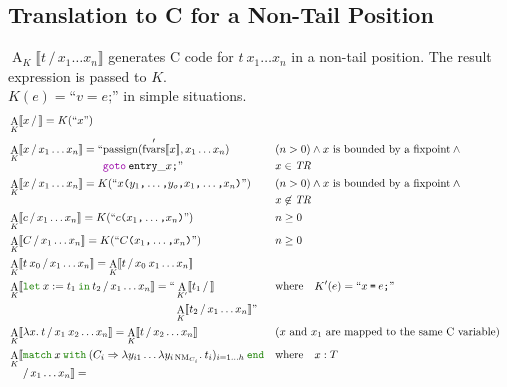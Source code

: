 \documentclass[a4paper,fleqn]{article}
\newcommand{\kwlet}{\mbox{\color{mygreen}\ttfamily let}}
\newcommand{\kwin}{\mbox{\color{mygreen}\ttfamily in}}
\newcommand{\kwmatch}{\mbox{\color{mygreen}\ttfamily match}}
\newcommand{\kwwith}{\mbox{\color{mygreen}\ttfamily with}}
\newcommand{\kwend}{\mbox{\color{mygreen}\ttfamily end}}
\newcommand{\lam}[2]{\lambda #1.\:#2}
\newcommand{\lamB}[1]{\lambda #1.\:}
\newcommand{\letin}[3]{\kwlet\:#1:=#2\:\kwin\:#3}
\newcommand{\match}[4]{\kwmatch\:#1\:\kwwith\:(#2 \Rightarrow #3)_{#4}\:\kwend}
\DeclareMathOperator{\NM}{NM} %
\newcommand{\BRA}[1]{\llbracket #1 \rrbracket}
\newcommand{\tr}{\mathit{TR}}
\newcommand{\ldq}{\text{``}}
\newcommand{\rdq}{\text{''}}
\newcommand{\dq}[1]{\text{``}#1\text{''}}
\newcommand{\ttparen}[1]{\texttt{(}#1\texttt{)}}
\newcommand{\tteq}{\texttt{=}}
\newcommand{\ttsemi}{\texttt{;}}
\newcommand{\ttcomma}{\texttt{,}}
\newcommand{\kwgoto}{\mbox{\color{myviolet}\ttfamily goto}}
\DeclareMathOperator{\passign}{passign}
\DeclareMathOperator{\fvarsop}{fvars}
\newcommand{\fvarsd}[1]{\fvarsop'\BRA{#1}}
\DeclareMathOperator{\Aop}{A}
\newcommand{\A}[3]{\Aop_{#1}\BRA{#2\,/\,#3}}
\newcommand{\AbreakEq}[3]{\Aop_{#1}\llbracket \begin{aligned}[t] & #2 \\ & /\, #3 \rrbracket = \end{aligned}}
\begin{document}
\subsection{Translation to C for a Non-Tail Position}\label{sec:AK}
$\A{K}{t}{x_1\ldots x_n}$ generates C code for $t\:x_1\ldots x_n$ in a non-tail position.
The result expression is passed to $K$. \\
$K(e) = \dq{v = e\ttsemi}$ in simple situations.
\begin{align*}
  &\A{K}{x}{} = K(\dq{x}) \\
  &\A{K}{x}{x_1\ldots x_n} =
      \begin{aligned}[t] \ldq & {\passign(\fvarsd{x}, x_1 \ldots x_n)} \\ & \kwgoto\:\mathtt{entry\_}x\ttsemi \rdq \end{aligned}
    && \begin{aligned}[t] & (n > 0) \wedge \text{$x$ is bounded by a fixpoint} \wedge {} \\ & x \in \tr \end{aligned} \\
  &\A{K}{x}{x_1\ldots x_n} = K(\dq{x\ttparen{y_1\ttcomma\dotsc\ttcomma y_o\ttcomma x_1\ttcomma\dotsc\ttcomma  x_n}})
    && \begin{aligned}[t] & (n > 0) \wedge \text{$x$ is bounded by a fixpoint} \wedge {} \\ & x \not\in \tr \end{aligned} \\
  &\A{K}{c}{x_1\ldots x_n} = K(\dq{c\ttparen{x_1\ttcomma\dotsc\ttcomma x_n}})                                   && n \geq 0 \\
  &\A{K}{C}{x_1\ldots x_n} = K(\dq{C\ttparen{x_1\ttcomma\dotsc\ttcomma x_n}})                                   && n \geq 0 \\
  &\A{K}{t\:x_0}{x_1\ldots x_n} = \A{K}{t}{x_0\:x_1\ldots x_n} \\
  &\A{K}{\letin{x}{t_1}{t_2}}{x_1\ldots x_n} =
      \begin{aligned}[t] \ldq & \A{K'}{t_1}{} \\ & \A{K}{t_2}{x_1\ldots x_n} \rdq \end{aligned}
    && \text{where}\quad K'(e) = \dq{x\:\tteq\:e\ttsemi} \\
  &\A{K}{\lam{x}{t}}{x_1\:x_2\ldots x_n} = \A{K}{t}{x_2\ldots x_n}                                  && \text{($x$ and $x_1$ are mapped to the same C variable)} \\
  &\AbreakEq{K}{\match{x}{C_i}{\lambda y_{i1}\ldots\lamB{y_{i\NM_{C_i}}}t_i}{i=1\ldots h}}{x_1\ldots x_n} && \text{where}\quad x : T \\

\end{align*}
\end{document}
